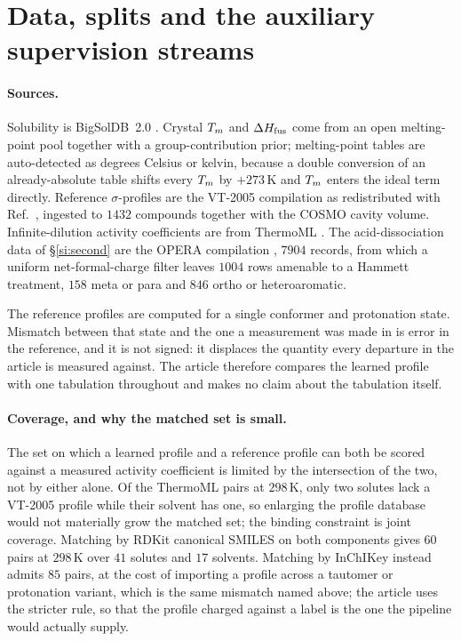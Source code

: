 \section{Data, splits and the auxiliary supervision streams}
\label{si:data}

\paragraph{Sources.}
Solubility is BigSolDB~2.0 \cite{krasnov2025bigsoldb}. Crystal $T_m$ and $\Delta H_{\mathrm{fus}}$ come from an open
melting-point pool together with a group-contribution prior; melting-point tables are auto-detected
as degrees Celsius or kelvin, because a double conversion of an already-absolute table shifts every
$T_m$ by $+273$\,K and $T_m$ enters the ideal term directly. Reference $\sigma$-profiles are the
VT-2005 compilation \cite{mullins2006} as redistributed with Ref.~\cite{bell2020cosmosac}, ingested
to $1432$ compounds together with the COSMO cavity volume. Infinite-dilution activity coefficients
are from ThermoML \cite{frenkel2011thermoml}. The acid-dissociation data of \S\ref{si:second} are
the OPERA compilation \cite{mansouri2019opera}, $7904$ records, from which a uniform
net-formal-charge filter leaves $1004$ rows amenable to a Hammett treatment, $158$ meta or para and
$846$ ortho or heteroaromatic.

The reference profiles are computed for a single conformer and protonation state. Mismatch between
that state and the one a measurement was made in is error in the reference, and it is not signed:
it displaces the quantity every departure in the article is measured against. The article therefore
compares the learned profile with one tabulation throughout and makes no claim about the tabulation
itself.

\paragraph{Coverage, and why the matched set is small.}
The set on which a learned profile and a reference profile can both be scored against a measured
activity coefficient is limited by the intersection of the two, not by either alone. Of the
ThermoML pairs at $298$\,K, only two solutes lack a VT-2005 profile while their solvent has one, so
enlarging the profile database would not materially grow the matched set; the binding constraint is
joint coverage. Matching by RDKit canonical SMILES on both components gives $60$ pairs at $298$\,K
over $41$ solutes and $17$ solvents. Matching by InChIKey instead admits $85$ pairs, at the cost of
importing a profile across a tautomer or protonation variant, which is the same mismatch named
above; the article uses the stricter rule, so that the profile charged against a label is the one
the pipeline would actually supply.


